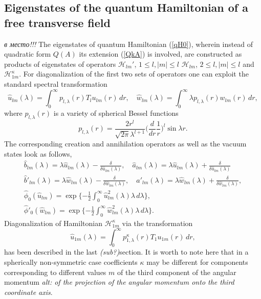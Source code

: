 \documentclass[12pt]{article}
\newcommand{\HH}{\mathscr{H}}
\begin{document}
\subsection{Eigenstates of the quantum Hamiltonian of a free transverse field}
{\it в место!!!}
	The eigenstates of quantum Hamiltonian
(\ref{qH0}),
	wherein instead of quadratic form
$ Q(A) $
	its extension 
(\ref{QkA}) is involved,
	are constructed as products of eigenstates of operators
$ \HH_{lm}' $, 
$ 1\leq l, |m| \leq l $
$ \HH_{lm} $,
$ 2\leq l, |m| \leq l $
	and
$ \HH_{1m}^{\kappa} $.
	For diagonalization of the first two sets of operators one can exploit
	the standard spectral transformation
\begin{equation*}
    \hat{u}_{lm}(\lambda)
	= \int_{0}^{\infty} p_{l,\lambda}(r) T_{l} u_{lm}(r)\,dr ,
    \quad \hat{w}_{lm}(\lambda)
	= \int_{0}^{\infty} \lambda p_{l,\lambda}(r) w_{lm}(r)\,dr ,
\end{equation*}
	where
$ p_{l,\lambda}(r) $
	is a variety of spherical Bessel functions
\begin{equation*}
    p_{l,\lambda}(r) = \frac{2r^{l}}{\sqrt{2\pi}\lambda^{l+1}}
	\bigl(\frac{d}{dr}\frac{1}{r}\bigr)^{l} \sin \lambda r .
\end{equation*}
	The corresponding creation and annihilation operators as well as the
	vacuum states look as follows,
\begin{gather*}
    \hat{b}_{lm}(\lambda) = \lambda \hat{u}_{lm}(\lambda)
	- \frac{\delta}{\delta \hat{u}_{lm}(\lambda)} ,\quad
    \hat{a}_{lm}(\lambda) = \lambda \hat{u}_{lm}(\lambda) 
	+ \frac{\delta}{\delta \hat{u}_{lm}(\lambda)} \\
    \hat{b}'_{lm}(\lambda) = \lambda \hat{w}_{lm}(\lambda)
	- \frac{\delta}{\delta \hat{w}_{lm}(\lambda)} ,\quad
    \hat{a}'_{lm}(\lambda) = \lambda \hat{w}_{lm}(\lambda) 
	+ \frac{\delta}{\delta \hat{w}_{lm}(\lambda)} ,\\
    \hat{\phi}_{0}(\hat{u}_{lm}) = \exp\{-\frac{1}{2}
	\int_{0}^{\infty} \hat{u}_{lm}^{2}(\lambda) \lambda \,d\lambda \} ,\\
    \hat{\phi}'_{0}(\hat{w}_{lm}) = \exp\{-\frac{1}{2}
	\int_{0}^{\infty} \hat{w}_{lm}^{2}(\lambda) \lambda \,d\lambda \} .
\end{gather*}
	Diagonalization of Hamiltonian
$ \HH_{1m}^{\kappa} $
	via the transformation
\begin{equation*}
    \hat{u}_{1m}(\lambda) = \int_{0}^{\infty} p_{1,\lambda}^{\kappa}(r)
	T_{1} u_{1m}(r)\,dr, 
\end{equation*}
	has been described in the last {\it(sub?)}section.
	It is worth to note here that in a spherically non-symmetric case
	coefficients
$ \kappa $
	may be different for components corresponding to different values
$ m $
	of the third component of the angular momentum
	{\it alt: of the projection of the angular momentum onto the third coordinate axis}.
\end{document}
